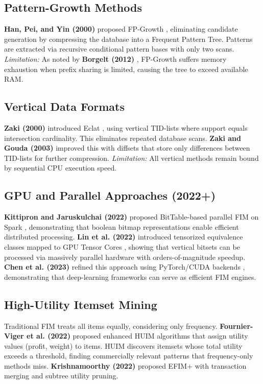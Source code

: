 \documentclass[conference]{IEEEtran}
\begin{document}
\subsection{Pattern-Growth Methods}
\textbf{Han, Pei, and Yin (2000)} proposed FP-Growth \cite{han2000mining}, eliminating candidate generation by compressing the database into a Frequent Pattern Tree. Patterns are extracted via recursive conditional pattern bases with only two scans. \textit{Limitation:} As noted by \textbf{Borgelt (2012)} \cite{borgelt2012frequent}, FP-Growth suffers memory exhaustion when prefix sharing is limited, causing the tree to exceed available RAM.

\subsection{Vertical Data Formats}
\textbf{Zaki (2000)} introduced Eclat \cite{zaki2000scalable}, using vertical TID-lists where support equals intersection cardinality. This eliminates repeated database scans. \textbf{Zaki and Gouda (2003)} improved this with diffsets \cite{fimi2004goethals} that store only differences between TID-lists for further compression. \textit{Limitation:} All vertical methods remain bound by sequential CPU execution speed.

\subsection{GPU and Parallel Approaches (2022+)}
\textbf{Kittipron and Jaruskulchai (2022)} proposed BitTable-based parallel FIM on Spark \cite{kittipron2022bittable}, demonstrating that boolean bitmap representations enable efficient distributed processing. \textbf{Lin et al. (2022)} introduced tensorized equivalence classes mapped to GPU Tensor Cores \cite{sota2022tensor}, showing that vertical bitsets can be processed via massively parallel hardware with orders-of-magnitude speedup. \textbf{Chen et al. (2023)} refined this approach using PyTorch/CUDA backends \cite{gpu2023fim}, demonstrating that deep-learning frameworks can serve as efficient FIM engines.

\subsection{High-Utility Itemset Mining}
Traditional FIM treats all items equally, considering only frequency. \textbf{Fournier-Viger et al. (2022)} proposed enhanced HUIM algorithms \cite{fournierviger2022huim} that assign utility values (profit, weight) to items. HUIM discovers itemsets whose total utility exceeds a threshold, finding commercially relevant patterns that frequency-only methods miss. \textbf{Krishnamoorthy (2022)} proposed EFIM+ \cite{krishnamoorthy2022efim} with transaction merging and subtree utility pruning.
\end{document}
